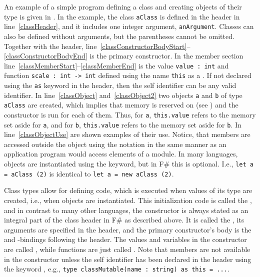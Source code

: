 An example of a simple program defining a class and creating objects of their type is given in .
%
%
%
In the example, the class \lstinline{aClass} is defined in the header in line~\ref{classHeader}, and it includes one integer argument, \lstinline{anArgument}. Classes can also be defined without arguments, but the parentheses cannot be omitted. Together with the header, line~\ref{classConstructorBodyStart}--\ref{classConstructorBodyEnd} is the primary constructor. In the member section line~\ref{classMemberStart}--\ref{classMemberEnd} is the value \lstinline{value : int} and function \lstinline{scale : int -> int} defined using the name \lstinline{this} as a . If not declared using the \lstinline{as} keyword in the header, then the self identifier can be any valid identifier. In line~\ref{classObject} and~\ref{classObject2} two objects \lstinline{a} and \lstinline{b} of type \lstinline{aClass} are created, which implies that memory is reserved on  (see ) and the constructor is run for each of them. Thus, for \lstinline{a}, \lstinline{this.value} refers to the memory set aside for \lstinline{a}, and for \lstinline{b}, \lstinline{this.value} refers to the memory set aside for \lstinline{b}. In line~\ref{classObjectUse} are shown examples of their use. Notice, that members are accessed outside the object using the  notation in the same manner as an application program would access elements of a module. In many languages, objects are instantiated using the  keyword, but in F\# this is optional. I.e., \lstinline{let a = aClass (2)} is identical to \lstinline{let a = new aClass (2)}.

Class types allow for defining code, which is executed when values of its type are created, i.e., when objects are instantiated. This initialization code is called the , and in contrast to many other languages, the constructor is always stated as an integral part of the class header in F\# as described above. It is called the , its arguments are specified in the header, and the primary constructor's body is the  and -bindings following the header. The values and variables in the constructor are called , while functions are just called . Note that members are not available in the constructor unless the self identifier has been declared in the header using the keyword , e.g., \lstinline{type classMutable(name : string) as this = ...}.

